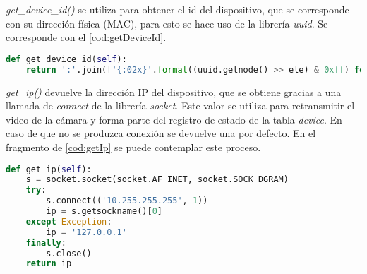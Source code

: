 \textit{get\_device\_id()} se utiliza para obtener el id del dispositivo, que se corresponde con su dirección física (MAC), para esto se hace uso de la librería \textit{uuid}. Se corresponde con el \autoref{cod:getDeviceId}.
\begin{lstlisting}[language=Python, label=cod:getDeviceId, caption=Metodo get\_device\_id()]
def get_device_id(self):
    return ':'.join(['{:02x}'.format((uuid.getnode() >> ele) & 0xff) for ele in range(0, 8 * 6, 8)][::-1])
\end{lstlisting}
\textit{get\_ip()} devuelve la dirección IP del dispositivo, que se obtiene gracias a una llamada de \textit{connect} de la librería \textit{socket}. Este valor se utiliza para retransmitir el video de la cámara y forma parte del registro de estado de la tabla \textit{device}. En caso de que no se produzca conexión se devuelve una por defecto. En el fragmento de \autoref{cod:getIp} se puede contemplar este proceso.
\begin{lstlisting}[language=Python, label=cod:getIp, caption=Metodo get\_ip()]
def get_ip(self):
    s = socket.socket(socket.AF_INET, socket.SOCK_DGRAM)
    try:
        s.connect(('10.255.255.255', 1))
        ip = s.getsockname()[0]
    except Exception:
        ip = '127.0.0.1'
    finally:
        s.close()
    return ip
\end{lstlisting}